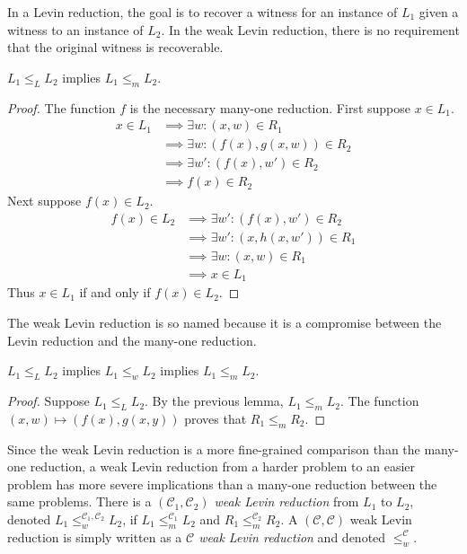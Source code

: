 \documentclass{article}
\begin{document}
In a Levin reduction, the goal is to recover a witness for an instance of $L_1$ given a witness to an instance of $L_2$.
In the weak Levin reduction, there is no requirement that the original witness is recoverable.

\begin{lemma}
  $L_1 \leq_L L_2$ implies $L_1 \leq_m L_2$.
\end{lemma}
\begin{proof}
  The function $f$ is the necessary many-one reduction.
  First suppose $x \in L_1$.
  \begin{align*}
    x \in L_1 & \implies \exists w \colon (x, w) \in R_1 \\
    & \implies \exists w \colon (f(x), g(x, w)) \in R_2 \\
    & \implies \exists w' \colon (f(x), w') \in R_2 \\
    & \implies f(x) \in R_2
  \end{align*}
  Next suppose $f(x) \in L_2$.
  \begin{align*}
    f(x) \in L_2 & \implies \exists w' \colon (f(x), w') \in R_2 \\
    & \implies \exists w' \colon (x, h(x, w')) \in R_1 \\
    & \implies \exists w \colon (x, w) \in R_1 \\
    & \implies x \in L_1
  \end{align*}
  Thus $x \in L_1$ if and only if $f(x) \in L_2$.
\end{proof}

The weak Levin reduction is so named because it is a compromise between the Levin reduction and the many-one reduction.

\begin{proposition}\label{prop:weaklevin}
  $L_1 \leq_L L_2$ implies $L_1 \leq_w L_2$ implies $L_1 \leq_m L_2$.
\end{proposition}
\begin{proof}
  Suppose $L_1 \leq_L L_2$.
  By the previous lemma, $L_1 \leq_m L_2$.
  The function $(x, w) \mapsto (f(x), g(x, y))$ proves that $R_1 \leq_m R_2$.
\end{proof}

Since the weak Levin reduction is a more fine-grained comparison than the many-one reduction, a weak Levin reduction from a harder problem to an easier problem has more severe implications than a many-one reduction between the same problems.
There is a \emph{$(\mathcal{C}_1, \mathcal{C}_2)$ weak Levin reduction} from $L_1$ to $L_2$, denoted $L_1 \leq^{\mathcal{C}_1, \mathcal{C}_2}_w L_2$, if $L_1 \leq^{\mathcal{C}_1}_m L_2$ and $R_1 \leq^{\mathcal{C}_2}_m R_2$.
A $(\mathcal{C}, \mathcal{C})$ weak Levin reduction is simply written as a \emph{$\mathcal{C}$ weak Levin reduction} and denoted $\leq^{\mathcal{C}}_w$.
\end{document}
